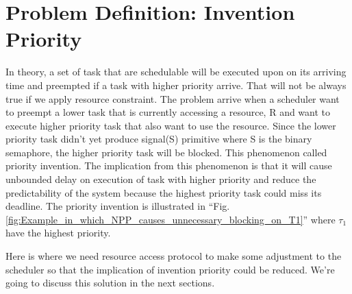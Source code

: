 \section{Problem Definition: Invention Priority}

In theory, a set of task that are schedulable will be executed upon on its arriving time and preempted if a task with higher priority arrive. That will not be always true if we apply resource constraint. The problem arrive when a scheduler want to preempt a lower task that is currently accessing a  resource, R and want to execute higher priority task that also want to use the resource. Since the lower priority task didn't yet produce signal(S) primitive where S is the binary semaphore, the higher priority task will be blocked. This phenomenon called priority invention. The implication from this phenomenon is that it will cause unbounded delay on execution of task with higher priority and reduce the predictability of the system because the highest priority task could miss its deadline. The priority invention is illustrated in ``Fig. \ref{fig:Example_in_which_NPP_causes_unnecessary_blocking_on_T1}'' where $ \tau_{1} $ have the highest priority.

Here is where we need resource access protocol to make some adjustment to the scheduler so that the implication of invention priority could be reduced. We're going to discuss this solution in the next sections.